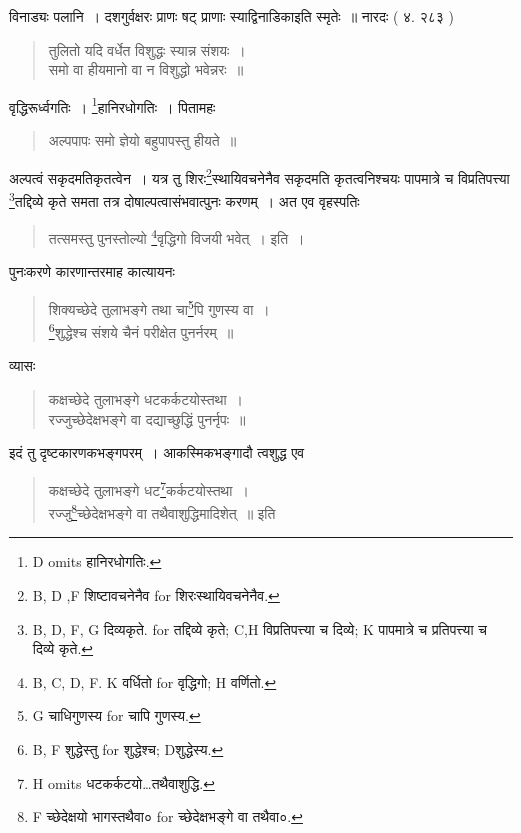 \documentclass[11pt, openany]{book}
\begin{document}
विनाड्यः पलानि~। दशगुर्वक्षरः प्राणः षट् प्राणाः स्याद्विनाडिकाइति स्मृतेः~॥ नारदः ( ४. २८३ )

\begin{quote}
{\vy तुलितो यदि वर्धेत विशुद्धः स्यान्न संशयः~।\\
समो वा हीयमानो वा न विशुद्धो भवेन्नरः~॥}
\end{quote}

वृद्धिरूर्ध्वगतिः~। \renewcommand{\thefootnote}{5}\footnote{D omits हानिरधोगतिः.}हानिरधोगतिः~। पितामहः

\begin{quote}
{\vy अल्पपापः समो ज्ञेयो बहुपापस्तु हीयते~॥}
\end{quote}

\newpage

\noindent
अल्पत्वं सकृदमतिकृतत्वेन~। यत्र तु शिरः\renewcommand{\thefootnote}{1}\footnote{ B, D ,F शिष्टावचनेनैव for शिरःस्थायिवचनेनैव.}स्थायिवचनेनैव सकृदमति कृतत्वनिश्चयः पापमात्रे च विप्रतिपत्त्या \renewcommand{\thefootnote}{2}\footnote{B, D, F, G दिव्यकृते. for तद्दिव्ये कृते; C,H विप्रतिपत्त्या च दिव्ये; K पापमात्रे च प्रतिपत्त्या च दिव्ये कृते.}तद्दिव्ये कृते समता तत्र दोषाल्पत्वासंभवात्पुनः करणम्~। अत एव वृहस्पतिः

\begin{quote}
{\vy तत्समस्तु पुनस्तोल्यो \renewcommand{\thefootnote}{3}\footnote{B, C, D, F. K वर्धितो for वृद्धिगो; H वर्णितो.}वृद्धिगो विजयी भवेत्~।} इति~।
\end{quote}

पुनःकरणे कारणान्तरमाह कात्यायनः

\begin{quote}
{\vy शिक्यच्छेदे तुलाभङ्गे तथा चा\renewcommand{\thefootnote}{4}\footnote{G चाधिगुणस्य for चापि गुणस्य.}पि गुणस्य वा~।\\
\renewcommand{\thefootnote}{5}\footnote{B, F शुद्धेस्तु for शुद्धेश्च; Dशुद्धेस्य.}शुद्धेश्च संशये चैनं परीक्षेत पुनर्नरम्~॥}
\end{quote}

व्यासः

\begin{quote}
{\vy कक्षच्छेदे तुलाभङ्गे धटकर्कटयोस्तथा~।\\
रज्जुच्छेदेक्षभङ्गे वा दद्याच्छुद्धिं पुनर्नृपः~॥}
\end{quote}

इदं तु दृष्टकारणकभङ्गपरम्~। आकस्मिकभङ्गादौ त्वशुद्ध एव

\begin{quote}
{\vy कक्षच्छेदे तुलाभङ्गे धट\renewcommand{\thefootnote}{6}\footnote{H omits धटकर्कटयो\ldots तथैवाशुद्धि.}कर्कटयोस्तथा~।\\
रज्जु\renewcommand{\thefootnote}{7}\footnote{F च्छेदेक्षयो भागस्तथैवा० for च्छेदेक्षभङ्गे वा तथैवा०.}च्छेदेक्षभङ्गे वा तथैवाशुद्धिमादिशेत्~॥} इति
\end{quote}
\end{document}
